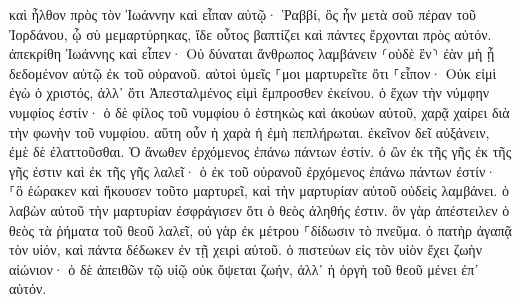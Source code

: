 \documentclass[twoside, 9pt]{extreport}
\begin{document}
καὶ ἦλθον πρὸς τὸν Ἰωάννην καὶ εἶπαν αὐτῷ· Ῥαββί, ὃς ἦν μετὰ σοῦ πέραν τοῦ Ἰορδάνου, ᾧ σὺ μεμαρτύρηκας, ἴδε οὗτος βαπτίζει καὶ πάντες ἔρχονται πρὸς αὐτόν. 
ἀπεκρίθη Ἰωάννης καὶ εἶπεν· Οὐ δύναται ἄνθρωπος λαμβάνειν ⸂οὐδὲ ἓν⸃ ἐὰν μὴ ᾖ δεδομένον αὐτῷ ἐκ τοῦ οὐρανοῦ. 
αὐτοὶ ὑμεῖς ⸀μοι μαρτυρεῖτε ὅτι ⸀εἶπον· Οὐκ εἰμὶ ἐγὼ ὁ χριστός, ἀλλ᾽ ὅτι Ἀπεσταλμένος εἰμὶ ἔμπροσθεν ἐκείνου. 
ὁ ἔχων τὴν νύμφην νυμφίος ἐστίν· ὁ δὲ φίλος τοῦ νυμφίου ὁ ἑστηκὼς καὶ ἀκούων αὐτοῦ, χαρᾷ χαίρει διὰ τὴν φωνὴν τοῦ νυμφίου. αὕτη οὖν ἡ χαρὰ ἡ ἐμὴ πεπλήρωται. 
ἐκεῖνον δεῖ αὐξάνειν, ἐμὲ δὲ ἐλαττοῦσθαι. 
Ὁ ἄνωθεν ἐρχόμενος ἐπάνω πάντων ἐστίν. ὁ ὢν ἐκ τῆς γῆς ἐκ τῆς γῆς ἐστιν καὶ ἐκ τῆς γῆς λαλεῖ· ὁ ἐκ τοῦ οὐρανοῦ ἐρχόμενος ἐπάνω πάντων ἐστίν· 
⸀ὃ ἑώρακεν καὶ ἤκουσεν τοῦτο μαρτυρεῖ, καὶ τὴν μαρτυρίαν αὐτοῦ οὐδεὶς λαμβάνει. 
ὁ λαβὼν αὐτοῦ τὴν μαρτυρίαν ἐσφράγισεν ὅτι ὁ θεὸς ἀληθής ἐστιν. 
ὃν γὰρ ἀπέστειλεν ὁ θεὸς τὰ ῥήματα τοῦ θεοῦ λαλεῖ, οὐ γὰρ ἐκ μέτρου ⸀δίδωσιν τὸ πνεῦμα. 
ὁ πατὴρ ἀγαπᾷ τὸν υἱόν, καὶ πάντα δέδωκεν ἐν τῇ χειρὶ αὐτοῦ. 
ὁ πιστεύων εἰς τὸν υἱὸν ἔχει ζωὴν αἰώνιον· ὁ δὲ ἀπειθῶν τῷ υἱῷ οὐκ ὄψεται ζωήν, ἀλλ᾽ ἡ ὀργὴ τοῦ θεοῦ μένει ἐπ᾽ αὐτόν. 
\end{document}
